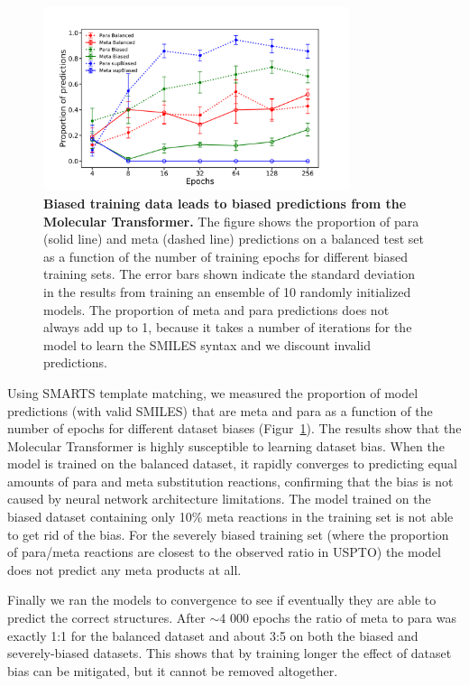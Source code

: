 \begin{figure}[htb!] 
    \centering    
    \includegraphics[width=0.8\textwidth]{Chapters/Transformer/Figs/synth_conv.png}
    \caption{ \textbf{Biased training data leads to biased predictions from the Molecular Transformer.} The figure shows the proportion of para (solid line) and meta (dashed line) predictions on a balanced test set as a function of the number of training epochs for different biased training sets. The error bars shown indicate the standard deviation in the results from training an ensemble of 10 randomly initialized models. The proportion of meta and para predictions does not always add up to 1, because it takes a number of iterations for the model to learn the SMILES syntax and we discount invalid predictions.}
    \label{fig:hamburger_plot}
\end{figure}


Using SMARTS template matching, we measured the proportion of model predictions (with valid SMILES) that are meta and para as a function of the number of epochs for different dataset biases (Figur~\ref{fig:hamburger_plot}). The results show that the Molecular Transformer is highly susceptible to learning dataset bias. When the model is trained on the balanced dataset, it rapidly converges to predicting equal amounts of para and meta substitution reactions, confirming that the bias is not caused by neural network architecture limitations. The model trained on the biased dataset containing only 10\% meta reactions in the training set is not able to get rid of the bias. For the severely biased training set (where the proportion of para/meta reactions are closest to the observed ratio in USPTO) the model does not predict any meta products at all.

Finally we ran the models to convergence to see if eventually they are able to predict the correct structures. After $\sim$4 000 epochs the ratio of meta to para was exactly 1:1 for the balanced dataset and about 3:5 on both the biased and severely-biased datasets. This shows that by training longer the effect of dataset bias can be mitigated, but it cannot be removed altogether. 

